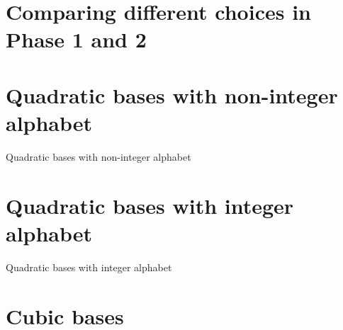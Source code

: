 

\section{Comparing different choices in Phase 1 and 2}



\section{Quadratic bases with non-integer alphabet}
\begin{table}[h]
	\begin{center}
	
	\end{center}
\caption{Quadratic bases with non-integer alphabet}
\label{tab:resultsQuadrNonint}
\end{table}


\section{Quadratic bases with integer alphabet}
\begin{table}[h]
	\begin{center}
	
	\end{center}
\caption{Quadratic bases with integer alphabet}
\label{tab:resultsQuadrInt}
\end{table}



\section{Cubic bases}





